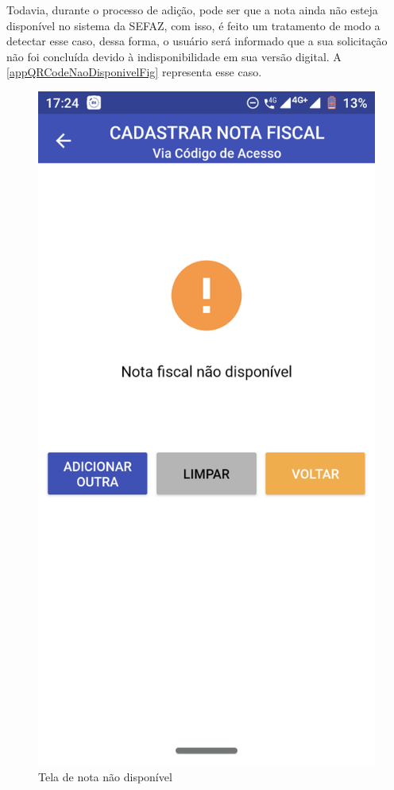 \begin{figure}[h]
    \label{appQRCodeSucessoFig}
\end{figure}

\newpage
Todavia, durante o processo de adição, pode ser que a nota ainda não esteja disponível no sistema da SEFAZ, com isso, é feito um tratamento de modo a detectar esse caso, dessa forma, o usuário será informado que a sua solicitação não foi concluída devido à indisponibilidade em sua versão digital. A \autoref{appQRCodeNaoDisponivelFig} representa esse caso.

\begin{figure}[h]
    \centering
    \caption{Tela de nota não disponível}
    \includegraphics[scale=0.15]{tcc/figures/app/app_codigo_acesso_nao_disponivel.png}

\end{figure}
